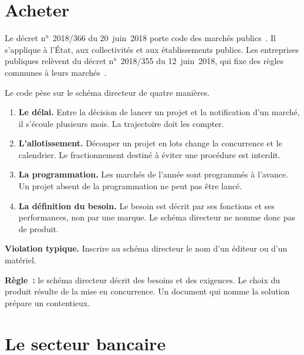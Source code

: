\section{Acheter}
\label{sec:c07-marches}

Le décret n°~2018/366 du 20~juin~2018 porte code des marchés publics~\cite{decret2018366}. Il s'applique à
l'État, aux collectivités et aux établissements publics. Les entreprises publiques relèvent du décret
n°~2018/355 du 12~juin~2018, qui fixe des règles communes à leurs marchés~\cite{decret2018355}.

Le code pèse sur le schéma directeur de quatre manières.

\begin{enumerate}
    \item \textbf{Le délai.} Entre la décision de lancer un projet et la notification d'un marché, il s'écoule
          plusieurs mois. La trajectoire doit les compter.
    \item \textbf{L'allotissement.} Découper un projet en lots change la concurrence et le calendrier. Le
          fractionnement destiné à éviter une procédure est interdit.
    \item \textbf{La programmation.} Les marchés de l'année sont programmés à l'avance. Un projet absent de la
          programmation ne peut pas être lancé.
    \item \textbf{La définition du besoin.} Le besoin est décrit par ses fonctions et ses performances, non par
          une marque. Le schéma directeur ne nomme donc pas de produit.
\end{enumerate}

\begin{boxalert}
\textbf{Violation typique.} Inscrire au schéma directeur le nom d'un éditeur ou d'un matériel.

\smallskip
\textbf{Règle~:} le schéma directeur décrit des besoins et des exigences. Le choix du produit résulte de la
mise en concurrence. Un document qui nomme la solution prépare un contentieux.
\end{boxalert}

\section{Le secteur bancaire}
\label{sec:c07-banque}

